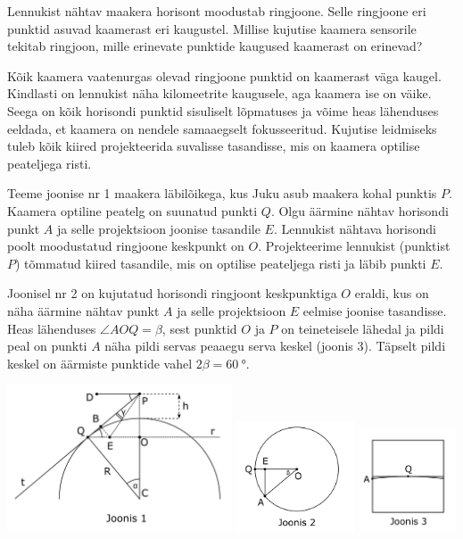 \documentclass[10pt]{article}
\begin{document}

\solu
Lennukist nähtav maakera horisont moodustab ringjoone. Selle ringjoone eri punktid asuvad kaamerast eri kaugustel. Millise kujutise kaamera sensorile tekitab ringjoon, mille erinevate punktide kaugused kaamerast on erinevad?

Kõik kaamera vaatenurgas olevad ringjoone punktid on kaamerast väga kaugel. Kindlasti on lennukist näha kilomeetrite kaugusele, aga kaamera ise on väike. Seega on kõik horisondi punktid sisuliselt lõpmatuses ja võime heas lähenduses eeldada, et kaamera on nendele samaaegselt fokusseeritud. Kujutise leidmiseks tuleb kõik kiired projekteerida suvalisse tasandisse, mis on kaamera optilise peateljega risti.

Teeme joonise nr 1 maakera läbilõikega, kus Juku asub maakera kohal punktis $P$. Kaamera optiline peatelg on suunatud punkti $Q$. Olgu äärmine nähtav horisondi punkt $A$ ja selle projektsioon joonise tasandile $E$. Lennukist nähtava horisondi poolt moodustatud ringjoone keskpunkt on $O$. Projekteerime lennukist (punktist $P$) tõmmatud kiired tasandile, mis on optilise peateljega risti ja läbib punkti $E$.

Joonisel nr 2 on kujutatud horisondi ringjoont keskpunktiga $O$ eraldi, kus on näha äärmine nähtav punkt $A$ ja selle projektsioon $E$ eelmise joonise tasandisse. Heas lähenduses $\angle AOQ = \beta$, sest punktid $O$ ja $P$ on teineteisele lähedal ja pildi peal on punkti $A$ näha pildi servas peaaegu serva keskel (joonis 3). Täpselt pildi keskel on äärmiste punktide vahel $2\beta = \SI{60}{\degree}$.

\begin{center}
\includegraphics[width=0.50\textwidth]{2019-lahg-10-sol1.png}
\includegraphics[width=0.265\textwidth]{2019-lahg-10-sol2.png}
\includegraphics[width=0.215\textwidth]{2019-lahg-10-sol3.png}
\end{center}
\end{document}
